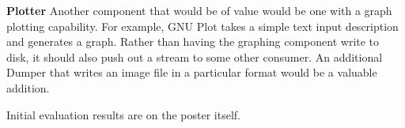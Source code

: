 \documentclass[conference]{IEEEtran}
\begin{document}
\textbf{Plotter}
Another component that would be of value would be one with a graph plotting
capability.  For example, GNU Plot
takes a simple
text input description and generates a graph.  Rather than having the graphing
component write to disk, it should also push out a stream to some other
consumer. An additional Dumper that writes an image file in a particular
format would be a valuable addition.

Initial evaluation results are on the poster itself.

%




\end{document}
